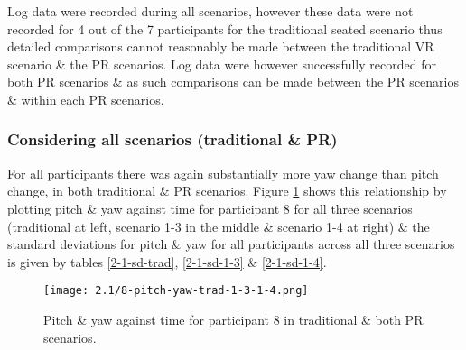 Log data were recorded during all scenarios, however these data were not recorded for 4 out of the 7 participants for the traditional seated scenario thus detailed comparisons cannot reasonably be made between the traditional VR scenario \& the PR scenarios. Log data were however successfully recorded for both PR scenarios \& as such comparisons can be made between the PR scenarios \& within each PR scenarios.


\subsubsection{Considering all scenarios (traditional \& PR)}

For all participants there was again substantially more yaw change than pitch change, in both traditional \& PR scenarios. Figure \ref{2-1-8-pitch-yaw-trad-1-3-1-4.png} shows this relationship by plotting pitch \& yaw against time for participant 8 for all three scenarios (traditional at left, scenario 1-3 in the middle \& scenario 1-4 at right) \& the standard deviations for pitch \& yaw for all participants across all three scenarios is given by tables \ref{2-1-sd-trad}, \ref{2-1-sd-1-3} \& \ref{2-1-sd-1-4}.

\begin{figure}[h]
	\begin{center}
	\texttt{[image: 2.1/8-pitch-yaw-trad-1-3-1-4.png]}
	\caption{Pitch \& yaw against time for participant 8 in traditional \& both PR scenarios.}
	\label{2-1-8-pitch-yaw-trad-1-3-1-4.png}
	\end{center}
\end{figure}

